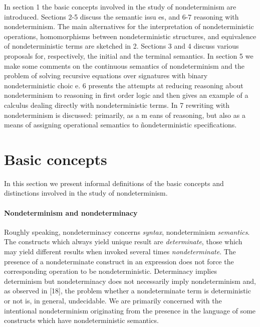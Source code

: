 \documentclass[10pt]{article}
\begin{document}
 In section 1 the basic concepts involved in 
the study of nondeterminism are introduced. Sections 2-5 discuss the 
semantic issu
es, and 6-7 reasoning with nondeterminism. The main alternatives for 
the interpretation of nondeterministic operations, homomorphisms 
between nondeterministic structures, and equivalence of 
nondeterministic terms are sketched in 2. Sections 3 and 4 discuss
 various proposals for, respectively, the initial and the terminal 
semantics. In section 5 we make some comments on the continuous 
semantics of nondeterminism and the problem of solving recursive 
equations over signatures with binary nondeterministic choic
e. 6 presents the attempts at reducing reasoning about nondeterminism 
to reasoning in first order logic and then gives an example of a 
calculus dealing directly with nondeterministic terms. In 7 rewriting 
with nondeterminism is discussed: primarily, as a m
eans of reasoning, but also as a means of assigning operational 
semantics to \~nondeterministic specifications.

\section{Basic concepts}\label{se:one}
In this section we present informal 
definitions of the basic concepts and distinctions involved in the 
study of nondeterminism. 

\paragraph*{Nondeterminism and nondeterminacy}
 Roughly speaking, nondeterminacy 
concerns {\em syntax}, nondeterminism {\em semantics}. The constructs 
which always yield unique result are {\em determinate}, those which 
may yield different results when invoked several times 
{\em non\-deter\-minate}. The presence of a 
nondetermi\-nate construct in an expression does not force the 
cor\-re\-sponding operation to be nondetermin\-istic. Determinacy implies 
determinism but nonde\-terminacy does not necessarily imply 
non\-deter\-minism and, as observed in [18], the problem whether a 
non\-determinate term is deter\-mi\-nistic or not is, in general, undecidable. 
We are primarily concerned with the intentional 
nondeterminism originating from the presence in the language of some 
constructs which have nondeterministic semantics. 
\end{document}
